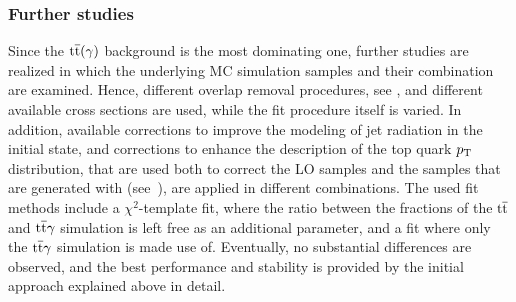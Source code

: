 \subsubsection*{Further studies}
Since the ${\mathrm{t}\overline{\mathrm{t}}}(\gamma)$ background is the most dominating one, further studies are realized in which the underlying MC simulation samples and their combination are examined. Hence, different overlap removal procedures, see , and different available cross sections are used, while the fit procedure itself is varied. In addition, available corrections to improve the modeling of jet radiation in the initial state, and corrections to enhance the description of the top quark $p_{\mathrm{T}}$ distribution, that are used both to correct the LO samples and the samples that are generated with \POWHEG (see~), are applied in different combinations. The used fit methods include a $\chi^2$-template fit, where the ratio between the fractions of the ${\mathrm{t}\overline{\mathrm{t}}}$ and ${\mathrm{t}\overline{\mathrm{t}}}\gamma$ simulation is left free as an additional parameter, and a fit where only the ${\mathrm{t}\overline{\mathrm{t}}}\gamma$ simulation is made use of. Eventually, no substantial differences are observed, and the best performance and stability is provided by the initial approach explained above in detail.



